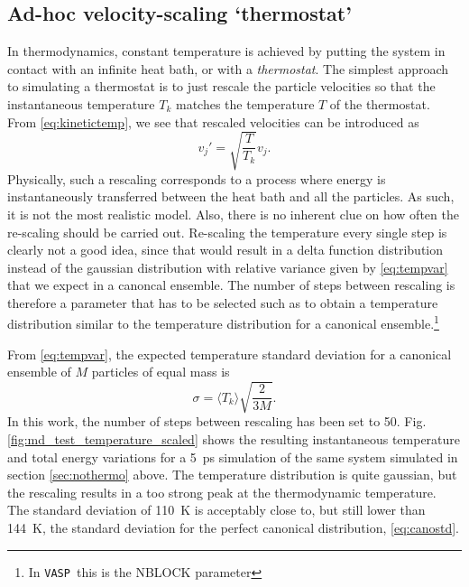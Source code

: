 \documentclass[11pt,bibliography=totoc,index=totoc]{scrbook}   %
\newcommand{\vasp}{{\texttt{VASP}}} %
\begin{document}
%
\subsection{Ad-hoc velocity-scaling `thermostat'}\label{sec:velocity-scaling}
%

In thermodynamics, constant temperature is achieved by putting the system in contact with an infinite heat bath, or with a \emph{thermostat}.
The simplest approach to simulating a thermostat is to just rescale the particle velocities so that the instantaneous temperature $T_k$ matches the temperature $T$ of the thermostat. 
From \eqref{eq:kinetictemp}, we see that rescaled velocities can be introduced as
\begin{equation}
    v_j' = \sqrt{\frac{T}{T_k}} v_j.
\end{equation}
Physically, such a rescaling corresponds to a process where energy is instantaneously transferred between the heat bath and all the particles. 
As such, it is not the most realistic model. 
Also, there is no inherent clue on how often the re-scaling should be carried out. 
Re-scaling the temperature every single step is clearly not a good idea, since that would result in a delta function distribution instead of the gaussian distribution with relative variance given by \eqref{eq:tempvar} that we expect in a canoncal ensemble.
The number of steps between rescaling is therefore a parameter that has to be selected such as to obtain a temperature distribution similar to the temperature distribution for a canonical ensemble.\footnote{In \vasp\ this is the NBLOCK parameter}

From \eqref{eq:tempvar}, the expected temperature standard deviation for a canonical ensemble of $M$ particles of equal mass is
\begin{equation}
  \sigma = \langle T_k \rangle \sqrt{\frac{2}{3M}}.
  \label{eq:canostd}
\end{equation}
In this work, the number of steps between rescaling has been set to 50.
Fig. \ref{fig:md_test_temperature_scaled} shows the resulting instantaneous temperature and total energy variations for a 5~ps simulation of the same system simulated in section \ref{sec:nothermo} above.
The temperature distribution is quite gaussian, but the rescaling results in a too strong peak at the thermodynamic temperature.
The standard deviation of 110~K is acceptably close to, but still lower than 144~K, the standard deviation for the perfect canonical distribution, \eqref{eq:canostd}.
\end{document}
